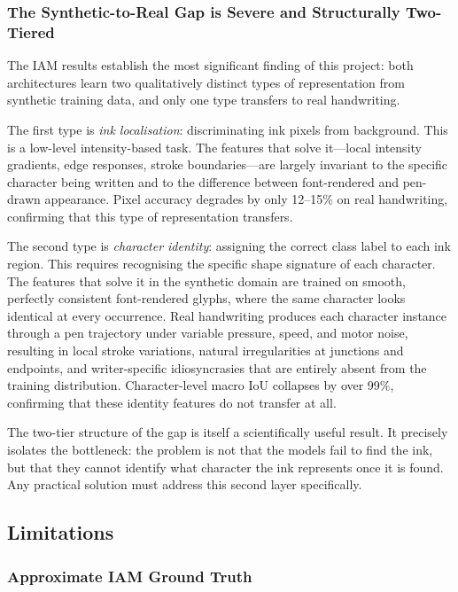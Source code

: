 \documentclass[a4paper,11pt]{article}
\begin{document}
\subsubsection{The Synthetic-to-Real Gap is Severe and Structurally Two-Tiered}

The IAM results establish the most significant finding of this project: both architectures
learn two qualitatively distinct types of representation from synthetic training data, and
only one type transfers to real handwriting.

The first type is \emph{ink localisation}: discriminating ink pixels from background.
This is a low-level intensity-based task. The features that solve it---local intensity
gradients, edge responses, stroke boundaries---are largely invariant to the specific
character being written and to the difference between font-rendered and pen-drawn
appearance. Pixel accuracy degrades by only 12--15\% on real handwriting, confirming that
this type of representation transfers.

The second type is \emph{character identity}: assigning the correct class label to each
ink region. This requires recognising the specific shape signature of each character. The
features that solve it in the synthetic domain are trained on smooth, perfectly consistent
font-rendered glyphs, where the same character looks identical at every occurrence. Real
handwriting produces each character instance through a pen trajectory under variable
pressure, speed, and motor noise, resulting in local stroke variations, natural
irregularities at junctions and endpoints, and writer-specific idiosyncrasies that are
entirely absent from the training distribution. Character-level macro IoU collapses by
over 99\%, confirming that these identity features do not transfer at all.

The two-tier structure of the gap is itself a scientifically useful result. It precisely
isolates the bottleneck: the problem is not that the models fail to find the ink, but that
they cannot identify what character the ink represents once it is found. Any practical
solution must address this second layer specifically.

\subsection{Limitations}

\subsubsection{Approximate IAM Ground Truth}
\label{sec:approx_gt}
\end{document}

